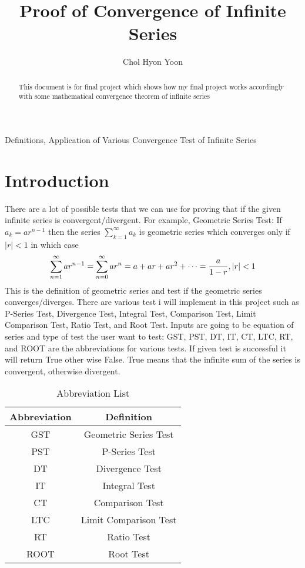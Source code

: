 \documentclass[12pt]{article}
\title{Proof of Convergence of Infinite Series}
\author{Chol Hyon Yoon}
\begin{document}
\maketitle
Definitions, Application of Various Convergence Test of Infinite Series

\begin{abstract}
This document is for final project which shows how my final project works accordingly with some mathematical convergence theorem of infinite series
\end{abstract}

\section{Introduction}

There are a lot of possible tests that we can use for proving that if the given infinite series is convergent/divergent. For example, 
Geometric Series Test: If $a_k = a r^{n-1}$ then the series $\sum_{k=1}^{\infty}a_k$ is geometric series which converges only if $|r|<1$ in which case
\[
\sum_{n=1}^{\infty}ar^{n-1}=\sum_{n=0}^{\infty}ar^n = a + ar + ar^2 + \dots   = {a \over 1-r}, |r|<1
\]
This is the definition of geometric series and test if the geometric series converges/diverges. There are various test i will implement in this project such as P-Series Test, Divergence Test, Integral Test, Comparison Test, Limit Comparison Test, Ratio Test, and Root Test. Inputs are going to be equation of series and type of test the user want to test: GST, PST, DT, IT, CT, LTC, RT, and ROOT are the abbreviations for various tests. If given test is successful it will return True other wise False. True means that the infinite sum of the series is convergent, otherwise divergent.

\begin{table}
\caption{Abbreviation List}
\centering
\begin{tabular}{c c}
\hline\hline
Abbreviation & Definition \\ [0.5ex]
\hline
GST & Geometric Series Test \\
PST & P-Series Test \\
DT & Divergence Test \\
IT & Integral Test \\
CT & Comparison Test \\
LTC & Limit Comparison Test \\
RT & Ratio Test \\
ROOT & Root Test \\
\hline
\end{tabular}
\label{table:abbv}
\end{table}
\end{document}
